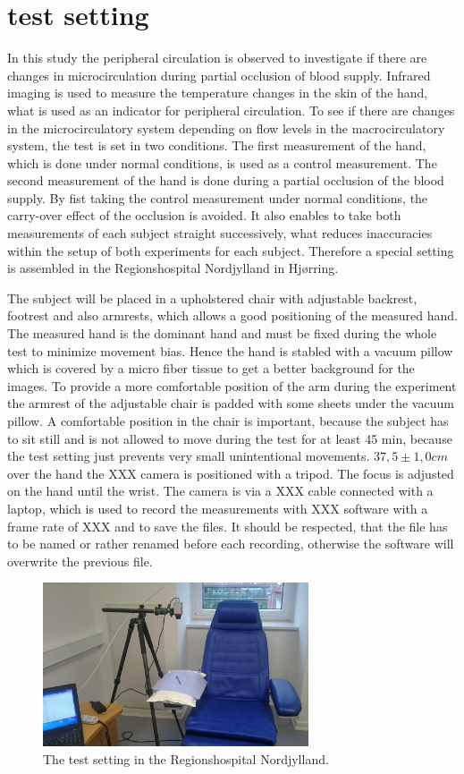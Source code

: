 \chapter{test setting}
In this study the peripheral circulation is observed to investigate if there are changes in microcirculation during partial occlusion of blood supply. Infrared imaging is used to measure the temperature changes in the skin of the hand, what is used as an indicator for peripheral circulation. 
To see if there are changes in the microcirculatory system depending on flow levels in the macrocirculatory system, the test is set in two conditions. The first measurement of the hand, which is done under normal conditions, is used as a control measurement. The second measurement of the hand is done during a partial occlusion of the blood supply. By fist taking the control measurement under normal conditions, the carry-over effect of the occlusion is avoided. It also enables to take both measurements of each subject straight successively, what reduces inaccuracies within the setup of both experiments for each subject. Therefore a special setting is assembled in the Regionshospital Nordjylland in Hj\o{}rring.

The subject will be placed in a upholstered chair with adjustable backrest, footrest and also armrests, which allows a good positioning of the measured hand. The measured hand is the dominant hand and must be fixed during the whole test to minimize movement bias. Hence the hand is stabled with a vacuum pillow which is covered by a micro fiber tissue to get a better background for the images. To provide a more comfortable position of the arm during the experiment the armrest of the adjustable chair is padded with some sheets under the vacuum pillow. A comfortable position in the chair is important, because the subject has to sit still and is not allowed to move during the test for at least 45 min, because the test setting just prevents very small unintentional movements.
$37,5\pm 1,0 cm$ over the hand the XXX camera is positioned with a tripod. The focus is adjusted on the hand until the wrist.
The camera is via a XXX cable connected with a laptop, which is used to record the measurements with XXX software with a frame rate of XXX and to save the files. It should be respected, that the file has to be named or rather renamed before each recording, otherwise the software will overwrite the previous file.

\begin{figure}[H]
	\includegraphics[width=0.7\textwidth]{figures/setting}
	\caption{The test setting in the Regionshospital Nordjylland.}
	\label{fig:FigureLABEL}
\end{figure}

